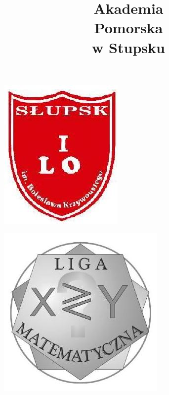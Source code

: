\documentclass[10pt]{article}
\title{Akademia \\
 Pomorska \\
 w Stupsku }
\author{}
\date{}
\begin{document}
\maketitle
\begin{center}
\includegraphics[max width=\textwidth]{2024_11_21_7622132ecf434143f224g-1}
\end{center}

\begin{center}
\includegraphics[max width=\textwidth]{2024_11_21_7622132ecf434143f224g-1(1)}
\end{center}
\end{document}
